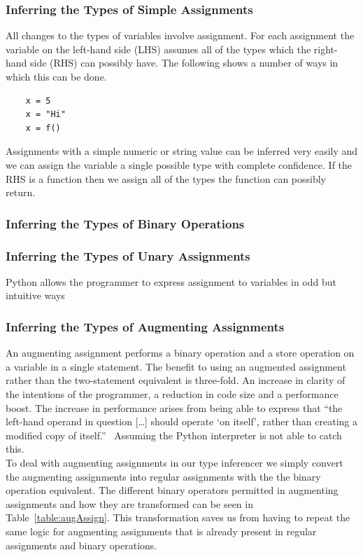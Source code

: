 \documentclass[12pt, titlepage]{article}
\begin{document}
\subsubsection{Inferring the Types of Simple Assignments}
All changes to the types of variables involve assignment. For each assignment the variable on the left-hand side (LHS) assumes all of the types which the right-hand side (RHS) can possibly have. The following shows a number of ways in which this can be done.
\begin{lstlisting}
	x = 5
	x = "Hi"
	x = f()
\end{lstlisting}
Assignments with a simple numeric or string value can be inferred very easily and we can assign the variable a single possible type with complete confidence. If the RHS is a function then we assign all of the types the function can possibly return.

\subsubsection{Inferring the Types of Binary Operations}

\subsubsection{Inferring the Types of Unary Assignments}
Python allows the programmer to express assignment to variables in odd but intuitive ways

\subsubsection{Inferring the Types of Augmenting Assignments}
An augmenting assignment performs a binary operation and a store operation on a variable in a single statement. The benefit to using an augmented assignment rather than the two-statement equivalent is three-fold. An increase in clarity of the intentions of the programmer, a reduction in code size and a performance boost. The increase in performance arises from being able to express that ``the left-hand operand in question [\ldots] should operate `on itself', rather than creating a modified copy of itself.''~\cite{pepAugAssign} Assuming the Python interpreter is not able to catch this. \\
To deal with augmenting assignments in our type inferencer we simply convert the augmenting assignments into regular assignments with the the binary operation equivalent. The different binary operators permitted in augmenting assignments and how they are transformed can be seen in Table~\ref{table:augAssign}. This transformation saves us from having to repeat the same logic for augmenting assignments that is already present in regular assignments and binary operations.
\end{document}

